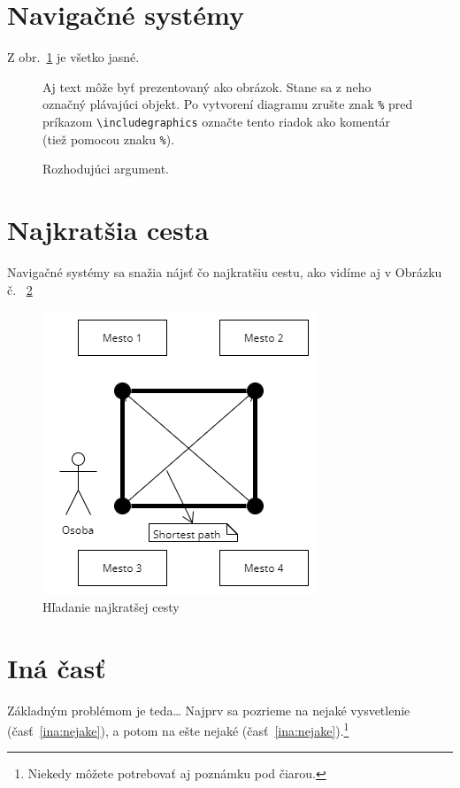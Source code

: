 \documentclass[10pt,twocolumn,twoside,slovak,a4paper]{article}
\begin{document}
\section{Navigačné systémy} \label{nejaka}

Z obr.~\ref{f:rozhod} je všetko jasné. 

\begin{figure}[tbh]
\centering
Aj text môže byť prezentovaný ako obrázok. Stane sa z neho označný plávajúci objekt. Po vytvorení diagramu zrušte znak \texttt{\%} pred príkazom \verb|\includegraphics| označte tento riadok ako komentár (tiež pomocou znaku \texttt{\%}).
\caption{Rozhodujúci argument.}
\label{f:rozhod}
\end{figure}



\section{Najkratšia cesta} \label{najkratsiaCesta}

Navigačné systémy sa snažia nájsť čo najkratšiu cestu, ako vidíme aj v Obrázku č. ~\ref{fig:hladanieNajkratsejCesty}
\begin{figure}[h!]
\centering
  \includegraphics[scale=0.6]{graf1.png}
  \caption{Hľadanie najkratšej cesty}
  \label{fig:hladanieNajkratsejCesty}
\end{figure}


\section{Iná časť} \label{ina}

Základným problémom je teda\ldots{} Najprv sa pozrieme na nejaké vysvetlenie (časť~\ref{ina:nejake}), a potom na ešte nejaké (časť~\ref{ina:nejake}).\footnote{Niekedy môžete potrebovať aj poznámku pod čiarou.}
\end{document}
